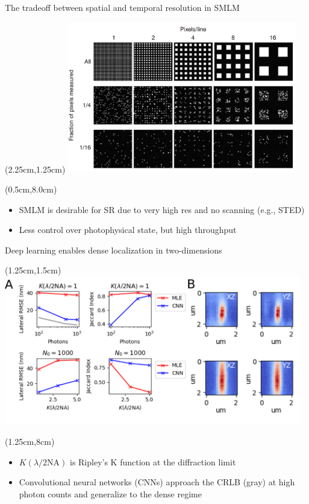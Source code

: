 \documentclass{beamer}					%
\begin{document}
\begin{frame}{The tradeoff between spatial and temporal resolution in SMLM}
\begin{textblock*}{10cm}(2.25cm,1.25cm)
\includegraphics[width=10cm]{Shroff.png}
\end{textblock*}
\begin{textblock*}{\textwidth}(0.5cm,8.0cm)
\begin{itemize}
\item SMLM is desirable for SR due to very high res and no scanning (e.g., STED)
\item Less control over photophysical state, but high throughput
\end{itemize}
\end{textblock*}
\end{frame}

\begin{frame}{Deep learning enables dense localization in two-dimensions}
\begin{textblock*}{13cm}(1.25cm,1.5cm)
\includegraphics[width=13cm]{PSF2D.png}
\end{textblock*}
\begin{textblock*}{13cm}(1.25cm,8cm)
\begin{itemize}
\item $K(\lambda/2\mathrm{NA})$ is Ripley's K function at the diffraction limit
\item Convolutional neural networks (CNNs) approach the CRLB (gray) at high photon counts and generalize to the dense regime
\end{itemize}
\end{textblock*}

\end{frame}
\end{document}

